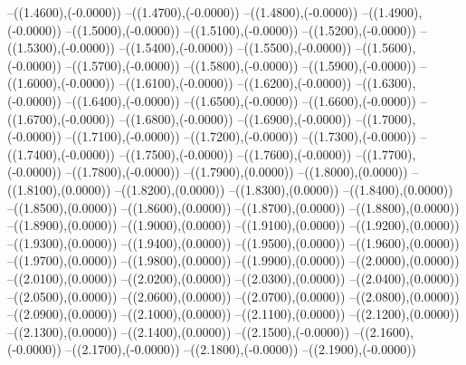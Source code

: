 {	--({\sx*(1.4600)},{\sy*(-0.0000)})
	--({\sx*(1.4700)},{\sy*(-0.0000)})
	--({\sx*(1.4800)},{\sy*(-0.0000)})
	--({\sx*(1.4900)},{\sy*(-0.0000)})
	--({\sx*(1.5000)},{\sy*(-0.0000)})
	--({\sx*(1.5100)},{\sy*(-0.0000)})
	--({\sx*(1.5200)},{\sy*(-0.0000)})
	--({\sx*(1.5300)},{\sy*(-0.0000)})
	--({\sx*(1.5400)},{\sy*(-0.0000)})
	--({\sx*(1.5500)},{\sy*(-0.0000)})
	--({\sx*(1.5600)},{\sy*(-0.0000)})
	--({\sx*(1.5700)},{\sy*(-0.0000)})
	--({\sx*(1.5800)},{\sy*(-0.0000)})
	--({\sx*(1.5900)},{\sy*(-0.0000)})
	--({\sx*(1.6000)},{\sy*(-0.0000)})
	--({\sx*(1.6100)},{\sy*(-0.0000)})
	--({\sx*(1.6200)},{\sy*(-0.0000)})
	--({\sx*(1.6300)},{\sy*(-0.0000)})
	--({\sx*(1.6400)},{\sy*(-0.0000)})
	--({\sx*(1.6500)},{\sy*(-0.0000)})
	--({\sx*(1.6600)},{\sy*(-0.0000)})
	--({\sx*(1.6700)},{\sy*(-0.0000)})
	--({\sx*(1.6800)},{\sy*(-0.0000)})
	--({\sx*(1.6900)},{\sy*(-0.0000)})
	--({\sx*(1.7000)},{\sy*(-0.0000)})
	--({\sx*(1.7100)},{\sy*(-0.0000)})
	--({\sx*(1.7200)},{\sy*(-0.0000)})
	--({\sx*(1.7300)},{\sy*(-0.0000)})
	--({\sx*(1.7400)},{\sy*(-0.0000)})
	--({\sx*(1.7500)},{\sy*(-0.0000)})
	--({\sx*(1.7600)},{\sy*(-0.0000)})
	--({\sx*(1.7700)},{\sy*(-0.0000)})
	--({\sx*(1.7800)},{\sy*(-0.0000)})
	--({\sx*(1.7900)},{\sy*(0.0000)})
	--({\sx*(1.8000)},{\sy*(0.0000)})
	--({\sx*(1.8100)},{\sy*(0.0000)})
	--({\sx*(1.8200)},{\sy*(0.0000)})
	--({\sx*(1.8300)},{\sy*(0.0000)})
	--({\sx*(1.8400)},{\sy*(0.0000)})
	--({\sx*(1.8500)},{\sy*(0.0000)})
	--({\sx*(1.8600)},{\sy*(0.0000)})
	--({\sx*(1.8700)},{\sy*(0.0000)})
	--({\sx*(1.8800)},{\sy*(0.0000)})
	--({\sx*(1.8900)},{\sy*(0.0000)})
	--({\sx*(1.9000)},{\sy*(0.0000)})
	--({\sx*(1.9100)},{\sy*(0.0000)})
	--({\sx*(1.9200)},{\sy*(0.0000)})
	--({\sx*(1.9300)},{\sy*(0.0000)})
	--({\sx*(1.9400)},{\sy*(0.0000)})
	--({\sx*(1.9500)},{\sy*(0.0000)})
	--({\sx*(1.9600)},{\sy*(0.0000)})
	--({\sx*(1.9700)},{\sy*(0.0000)})
	--({\sx*(1.9800)},{\sy*(0.0000)})
	--({\sx*(1.9900)},{\sy*(0.0000)})
	--({\sx*(2.0000)},{\sy*(0.0000)})
	--({\sx*(2.0100)},{\sy*(0.0000)})
	--({\sx*(2.0200)},{\sy*(0.0000)})
	--({\sx*(2.0300)},{\sy*(0.0000)})
	--({\sx*(2.0400)},{\sy*(0.0000)})
	--({\sx*(2.0500)},{\sy*(0.0000)})
	--({\sx*(2.0600)},{\sy*(0.0000)})
	--({\sx*(2.0700)},{\sy*(0.0000)})
	--({\sx*(2.0800)},{\sy*(0.0000)})
	--({\sx*(2.0900)},{\sy*(0.0000)})
	--({\sx*(2.1000)},{\sy*(0.0000)})
	--({\sx*(2.1100)},{\sy*(0.0000)})
	--({\sx*(2.1200)},{\sy*(0.0000)})
	--({\sx*(2.1300)},{\sy*(0.0000)})
	--({\sx*(2.1400)},{\sy*(0.0000)})
	--({\sx*(2.1500)},{\sy*(-0.0000)})
	--({\sx*(2.1600)},{\sy*(-0.0000)})
	--({\sx*(2.1700)},{\sy*(-0.0000)})
	--({\sx*(2.1800)},{\sy*(-0.0000)})
	--({\sx*(2.1900)},{\sy*(-0.0000)})
}
